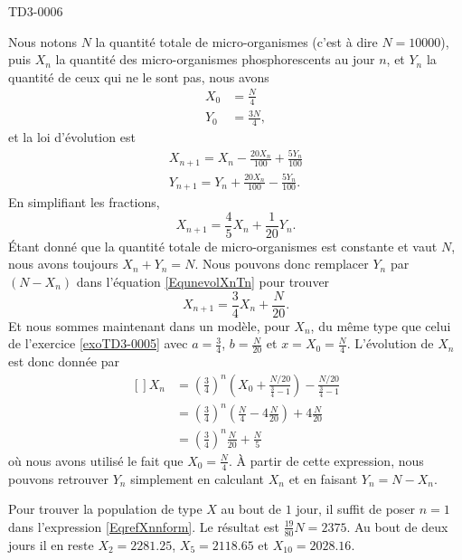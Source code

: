 
\begin{corrige}{TD3-0006}

	Nous notons $N$ la quantité totale de micro-organismes (c'est à dire $N=10000$), puis $X_n$ la quantité des micro-organismes phosphorescents au jour $n$, et $Y_n$ la quantité de ceux qui ne le sont pas, nous avons
	\begin{subequations}
		\begin{align}
			X_0&=\frac{N}{ 4 }\\
			Y_0&=\frac{ 3N }{ 4 },
		\end{align}
	\end{subequations}
	et la loi d'évolution est
	\begin{subequations}
		\begin{align}
			X_{n+1}=X_n-\frac{ 20 X_n }{ 100 }+\frac{ 5Y_n }{ 100 }\\
			Y_{n+1}=Y_n+\frac{ 20 X_n }{ 100 }-\frac{ 5Y_n }{ 100 }.
		\end{align}
	\end{subequations}
	En simplifiant les fractions,
	\begin{equation}		\label{EqunevolXnTn}
		X_{n+1}=\frac{ 4 }{ 5 }X_n+\frac{1}{ 20 }Y_n.
	\end{equation}
	Étant donné que la quantité totale de micro-organismes est constante et vaut $N$, nous avons toujours $X_n+Y_n=N$. Nous pouvons donc remplacer $Y_n$ par $(N-X_n)$ dans l'équation \eqref{EqunevolXnTn} pour trouver 
	\begin{equation}
		X_{n+1}=\frac{ 3 }{ 4 }X_n+\frac{ N }{ 20 }.
	\end{equation}
	Et nous sommes maintenant dans un modèle, pour $X_n$, du même type que celui de l'exercice \ref{exoTD3-0005} avec $a=\frac{ 3 }{ 4 }$, $b=\frac{ N }{ 20 }$ et $x=X_0=\frac{ N }{ 4 }$. L'évolution de $X_n$ est donc donnée par
	\begin{equation}		\label{EqrefXnnform}
		\begin{aligned}[]
			X_n&=\left( \frac{ 3 }{ 4 } \right)^n\left( X_0+\frac{ N/20 }{ \frac{ 3 }{ 4 }-1 } \right)-\frac{ N/20 }{ \frac{ 3 }{ 4 }-1 }\\
			&=\left( \frac{ 3 }{ 4 } \right)^n\left( \frac{ N }{ 4 }-4\frac{ N }{ 20 } \right)+4\frac{ N }{ 20 }\\
			&=\left( \frac{ 3 }{ 4 } \right)^n\frac{ N }{ 20 }+\frac{ N }{ 5 }
		\end{aligned}
	\end{equation}
	où nous avons utilisé le fait que $X_0=\frac{ N }{ 4 }$. À partir de cette expression, nous pouvons retrouver $Y_n$ simplement en calculant $X_n$ et en faisant $Y_n=N-X_n$.

	Pour trouver la population de type $X$ au bout de $1$ jour, il suffit de poser $n=1$ dans l'expression \eqref{EqrefXnnform}. Le résultat est $\frac{ 19 }{ 80 }N=2375$. Au bout de deux jours il en reste $X_2=2281.25$, $X_5=2118.65$ et $X_10=2028.16$.


\end{corrige}
